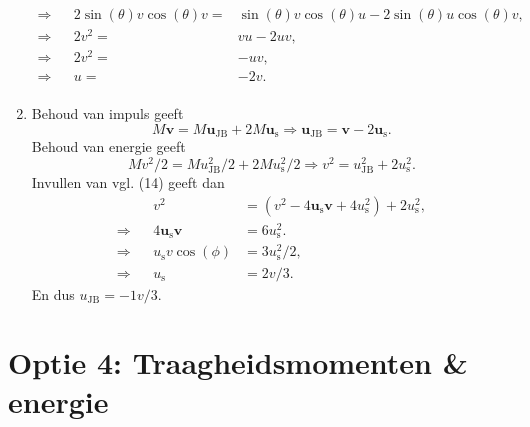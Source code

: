 \documentclass[a4paper,11pt]{article}
\begin{document}
\begin{enumerate}[label=(\alph*)]
\begin{align}
            \Rightarrow&&2\sin(\theta) v \cos(\theta) v =& \sin(\theta) v \cos(\theta) u - 2 \sin(\theta) u \cos(\theta) v,\\
            \Rightarrow&&2v^2 =& vu - 2 uv,\\
            \Rightarrow&&2v^2 =& - uv,\\
             \Rightarrow&&u =& - 2v.\\
    \end{align}
    \item 
        Behoud van impuls geeft
        \begin{equation}
            M\boldsymbol{v} = M\boldsymbol{u_{\mathrm{JB}}} + 2M\boldsymbol{u_{\mathrm{s}}} \Rightarrow \boldsymbol{u_{\mathrm{JB}}} = \boldsymbol{v} - 2\boldsymbol{u_{\mathrm{s}}}.
        \end{equation}
        Behoud van energie geeft
        \begin{equation}
            Mv^2/2 = Mu_{\mathrm{JB}}^2/2 + 2Mu_{\mathrm{s}}^2/2 \Rightarrow v^2 = u_{\mathrm{JB}}^2 + 2u_{\mathrm{s}}^2.
        \end{equation}
        Invullen van vgl. (14) geeft dan
        \begin{align}
            &&v^2 &= (v^2 - 4\boldsymbol{u_{\mathrm{s}}} \boldsymbol{v} + 4u_{\mathrm{s}}^2) + 2u_{\mathrm{s}}^2,\\
            \Rightarrow&&4\boldsymbol{u_{\mathrm{s}}} \boldsymbol{v} & = 6u_{\mathrm{s}}^2.\\
            \Rightarrow&&u_{\mathrm{s}}v \cos(\phi) &= 3u_{\mathrm{s}}^2/2,\\
            \Rightarrow&&u_{\mathrm{s}} &= 2v/3.
        \end{align}
        En dus $u_{\mathrm{JB}} = -1v/3$.
\end{enumerate}



\newpage
\section*{Optie 4: Traagheidsmomenten \& energie}
\end{document}
